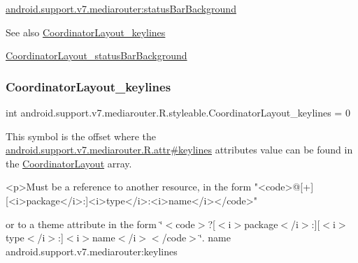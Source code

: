 {\ttfamily \hyperlink{classandroid_1_1support_1_1v7_1_1mediarouter_1_1R_1_1styleable_acc0a49035b9e1de6017995e700ec83f4}{android.\+support.\+v7.\+mediarouter\+:status\+Bar\+Background}}

\begin{DoxySeeAlso}{See also}
\hyperlink{classandroid_1_1support_1_1v7_1_1mediarouter_1_1R_1_1styleable_ae86cea8b9a6e3208df0e1e6176ee9287}{Coordinator\+Layout\+\_\+keylines} 

\hyperlink{classandroid_1_1support_1_1v7_1_1mediarouter_1_1R_1_1styleable_acc0a49035b9e1de6017995e700ec83f4}{Coordinator\+Layout\+\_\+status\+Bar\+Background} 
\end{DoxySeeAlso}
\mbox{\label{classandroid_1_1support_1_1v7_1_1mediarouter_1_1R_1_1styleable_ae86cea8b9a6e3208df0e1e6176ee9287}} 
\subsubsection{\texorpdfstring{Coordinator\+Layout\+\_\+keylines}{CoordinatorLayout\_keylines}}
{\footnotesize\ttfamily int android.\+support.\+v7.\+mediarouter.\+R.\+styleable.\+Coordinator\+Layout\+\_\+keylines = 0\hspace{0.3cm}{\ttfamily [static]}}

This symbol is the offset where the \hyperlink{classandroid_1_1support_1_1v7_1_1mediarouter_1_1R_1_1attr_a53b6bbac28b9bdef73522b0d16a6a6dc}{android.\+support.\+v7.\+mediarouter.\+R.\+attr\#keylines} attribute\textquotesingle{}s value can be found in the \hyperlink{classandroid_1_1support_1_1v7_1_1mediarouter_1_1R_1_1styleable_ae61e7ce081662158e58eb0cf6923a3cb}{Coordinator\+Layout} array.

\begin{DoxyVerb}      <p>Must be a reference to another resource, in the form "<code>@[+][<i>package</i>:]<i>type</i>:<i>name</i></code>"
\end{DoxyVerb}
 or to a theme attribute in the form \char`\"{}$<$code$>$?\mbox{[}$<$i$>$package$<$/i$>$\+:\mbox{]}\mbox{[}$<$i$>$type$<$/i$>$\+:\mbox{]}$<$i$>$name$<$/i$>$$<$/code$>$\char`\"{}.  name android.\+support.\+v7.\+mediarouter\+:keylines \mbox{\label{classandroid_1_1support_1_1v7_1_1mediarouter_1_1R_1_1styleable_a751aa4d9918369b542c5387a38a26624}} 
